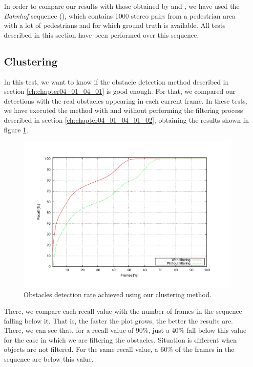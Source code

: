 In order to compare our results with those obtained by \cite{gunyel2012stixels} and \cite{benenson2011stixels}, we have used the \emph{Bahnhof} sequence (\cite{ess2009robust}), which contains 1000 stereo pairs from a pedestrian area with a lot of pedestrians and for which ground truth is available. All tests described in this section have been performed over this sequence.

\subsection{Clustering}\label{ch:chapter04_02_01}

In this test, we want to know if the obstacle detection method described in section \ref{ch:chapter04_01_04_01} is good enough. For that, we compared our detections with the real obstacles appearing in each current frame. In these tests, we have executed the method with and without performing the filtering process described in section \ref{ch:chapter04_01_04_01_02}, obtaining the results shown in figure \ref{fig:cp04_detection_rate}.

\begin{figure}[h!]
\centering
\includegraphics[trim=50 40 80 60,clip]{detectionRate}
\caption{Obstacles detection rate achieved using our clustering method.}\label{fig:cp04_detection_rate}
\end{figure}

There, we compare each recall value with the number of frames in the sequence falling below it. That is, the faster the plot grows, the better the results are. There, we can see that, for a recall value of 90\%, just a 40\% fall below this value for the case in which we are filtering the obstacles. Situation is different when objects are not filtered. For the same recall value, a 60\% of the frames in the sequence are below this value.

